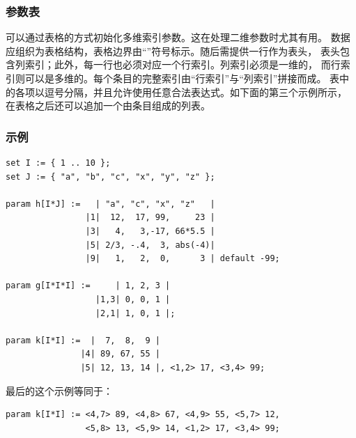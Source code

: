 \subsubsection{参数表}
可以通过表格的方式初始化多维索引参数。这在处理二维参数时尤其有用。
数据应组织为表格结构，表格边界由“\code{|}”符号标示。随后需提供一行作为表头，
表头包含列索引；此外，每一行也必须对应一个行索引。列索引必须是一维的，
而行索引则可以是多维的。每个条目的完整索引由“行索引”与“列索引”拼接而成。
表中的各项以逗号分隔，并且允许使用任意合法表达式。如下面的第三个示例所示，
在表格之后还可以追加一个由条目组成的列表。



\subsubsection{示例}
{\small
\begin{verbatim}
set I := { 1 .. 10 };
set J := { "a", "b", "c", "x", "y", "z" };

param h[I*J] :=   | "a", "c", "x", "z"   |
                |1|  12,  17, 99,     23 |
                |3|   4,   3,-17, 66*5.5 |
                |5| 2/3, -.4,  3, abs(-4)|
                |9|   1,   2,  0,      3 | default -99;

param g[I*I*I] :=     | 1, 2, 3 |
                  |1,3| 0, 0, 1 |
                  |2,1| 1, 0, 1 |;

param k[I*I] :=  |  7,  8,  9 |
               |4| 89, 67, 55 |
               |5| 12, 13, 14 |, <1,2> 17, <3,4> 99;
\end{verbatim}
}

\noindent 最后的这个示例等同于：
{\small
\begin{verbatim}
param k[I*I] := <4,7> 89, <4,8> 67, <4,9> 55, <5,7> 12,
                <5,8> 13, <5,9> 14, <1,2> 17, <3,4> 99;
\end{verbatim}
}

